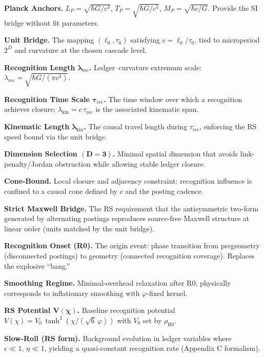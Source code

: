 \documentclass[11pt]{article}
\theoremstyle{definition}
\theoremstyle{remark}
\begin{document}
\noindent
\textbf{Planck Anchors.} \(L_P=\sqrt{\hbar G/c^3}\), \(T_P=\sqrt{\hbar G/c^5}\), \(M_P=\sqrt{\hbar c/G}\). Provide the SI bridge without fit parameters.

\noindent
\textbf{Unit Bridge.} The mapping \((\ell_0,\tau_0)\) satisfying \(c=\ell_0/\tau_0\), tied to microperiod \(2^D\) and curvature at the chosen cascade level.

\noindent
\textbf{Recognition Length \(\boldsymbol{\lambda_{\mathrm{rec}}}\).} Ledger–curvature extremum scale:
\(\lambda_{\mathrm{rec}}=\sqrt{\hbar G/(\pi c^3)}\).

\noindent
\textbf{Recognition Time Scale \(\boldsymbol{\tau_{\mathrm{rec}}}\).} The time window over which a recognition achieves closure; \(\lambda_{\mathrm{kin}}=c\,\tau_{\mathrm{rec}}\) is the associated kinematic span.

\noindent
\textbf{Kinematic Length \(\boldsymbol{\lambda_{\mathrm{kin}}}\).} The causal travel length during \(\tau_{\mathrm{rec}}\), enforcing the RS speed bound via the unit bridge.

\noindent
\textbf{Dimension Selection \(\boldsymbol{(D=3)}\).} Minimal spatial dimension that avoids link-penalty/Jordan obstruction while allowing stable ledger closure.

\noindent
\textbf{Cone-Bound.} Local closure and adjacency constraint: recognition influence is confined to a causal cone defined by \(c\) and the posting cadence.

\noindent
\textbf{Strict Maxwell Bridge.} The RS requirement that the antisymmetric two-form generated by alternating postings reproduces source-free Maxwell structure at linear order (units matched by the unit bridge).

\noindent
\textbf{Recognition Onset (R0).} The origin event: phase transition from pregeometry (disconnected postings) to geometry (connected recognition coverage). Replaces the explosive ``bang.''

\noindent
\textbf{Smoothing Regime.} Minimal-overhead relaxation after R0; physically corresponds to inflationary smoothing with \(\varphi\)-fixed kernel.

\noindent
\textbf{RS Potential \(\boldsymbol{V(\chi)}\).} Baseline recognition potential \(V(\chi)=V_0\,\tanh^2(\chi/(\sqrt6\,\varphi))\) with \(V_0\) set by \(\rho_{\mathrm{R0}}\).

\noindent
\textbf{Slow-Roll (RS form).} Background evolution in ledger variables where \(\epsilon\ll1,\,\eta\ll1\), yielding a quasi-constant recognition rate (Appendix C formalism).
\end{document}
